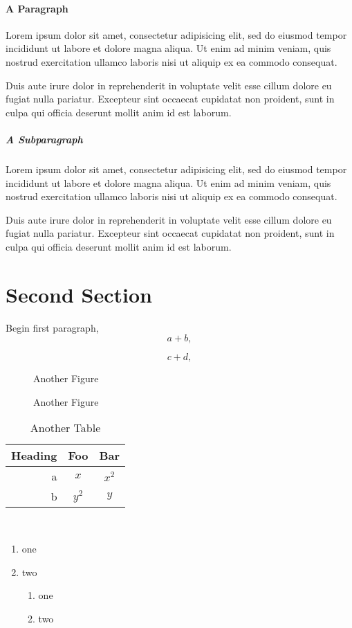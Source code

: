 \documentclass{article}
\begin{document}
\paragraph{A Paragraph}
Lorem ipsum dolor sit amet, consectetur adipisicing elit, sed do eiusmod tempor incididunt ut labore et dolore magna aliqua. Ut enim ad minim veniam, quis nostrud exercitation ullamco laboris nisi ut aliquip ex ea commodo consequat.

Duis aute irure dolor in reprehenderit in voluptate velit esse cillum dolore eu fugiat nulla pariatur. Excepteur sint occaecat cupidatat non proident, sunt in culpa qui officia deserunt mollit anim id est laborum.

\subparagraph{A Subparagraph}
Lorem ipsum dolor sit amet, consectetur adipisicing elit, sed do eiusmod tempor incididunt ut labore et dolore magna aliqua. Ut enim ad minim veniam, quis nostrud exercitation ullamco laboris nisi ut aliquip ex ea commodo consequat.

Duis aute irure dolor in reprehenderit in voluptate velit esse cillum dolore eu fugiat nulla pariatur. Excepteur sint occaecat cupidatat non proident, sunt in culpa qui officia deserunt mollit anim id est laborum.


\section{Second Section}
Begin first paragraph,
\begin{equation}
 a + b,
\end{equation}

\begin{equation}
 c + d,
\end{equation}

\begin{figure}
\begin{centering}
Another Figure\\
\end{centering}
\caption{Another Figure}
\end{figure}

\begin{table}
\begin{centering}
\begin{tabular}{r|cc}
Heading & Foo & Bar\\\hline
a & $x$ & $x^2$\\
b & $y^2$ & $y$\\
\end{tabular}\\
\end{centering}
\caption{Another Table}
\end{table}

\begin{enumerate}
 \item one
 \item two
   \begin{enumerate}
    \item one
    \item two
   \end{enumerate}
\end{enumerate}
\end{document}
